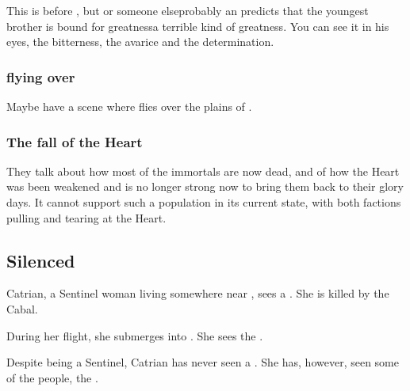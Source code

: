 This is before , but \Nzessuacrith{} or someone else\dash probably an \ophidian\dash predicts that the youngest brother is bound for greatness\dash a terrible kind of greatness. 
You can see it in his eyes, the bitterness, the avarice and the determination. 





\subsubsection{\Nzessuacrith{} flying over \Machai}
Maybe have a scene where \Nzessuacrith{} flies over the plains of \Machai{}. 






\subsubsection{The fall of the Heart}
They talk about how most of the immortals are now dead, and of how the Heart was been weakened and is no longer strong now to bring them back to their glory days.
It cannot support such a population in its current state, with both factions pulling and tearing at the Heart. 









\subsection{Silenced}
Catrian, a Sentinel woman living somewhere near \Redce, sees a \bane{}. She is killed by the Cabal. 

During her flight, she submerges into \Nyx. She sees the . 

Despite being a Sentinel, Catrian has never seen a \dragon. She has, however, seen some of the \draconian{} people, the \rachyth. 







